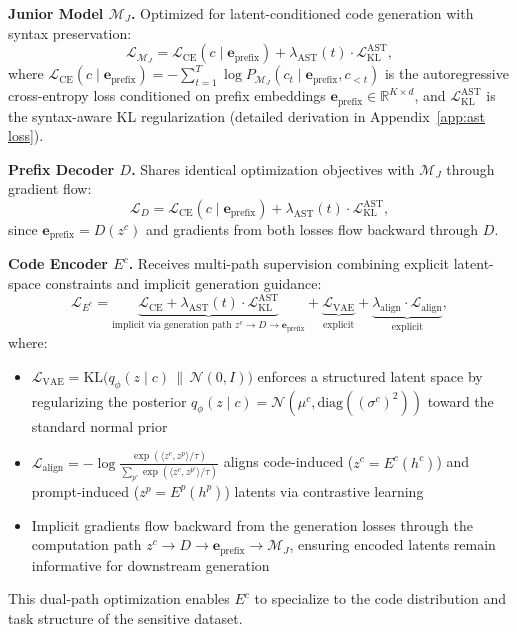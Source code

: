\documentclass{article}
\theoremstyle{plain}
\theoremstyle{definition}
\theoremstyle{remark}
\begin{document}
{\noindent\textbf{Junior Model $\mathcal{M}_J$.} Optimized for latent-conditioned code generation with syntax preservation:
\begin{equation}
\mathcal{L}_{\mathcal{M}_J} = \mathcal{L}_{\text{CE}}(c \mid \mathbf{e}_{\text{prefix}}) + \lambda_{\text{AST}}(t) \cdot \mathcal{L}_{\text{KL}}^{\text{AST}},
\end{equation}
where $\mathcal{L}_{\text{CE}}(c \mid \mathbf{e}_{\text{prefix}}) = -\sum_{t=1}^{T} \log P_{\mathcal{M}_J}(c_t \mid \mathbf{e}_{\text{prefix}}, c_{<t})$ is the autoregressive cross-entropy loss conditioned on prefix embeddings $\mathbf{e}_{\text{prefix}} \in \mathbb{R}^{K \times d}$, and $\mathcal{L}_{\text{KL}}^{\text{AST}}$ is the syntax-aware KL regularization (detailed derivation in Appendix~\ref{app:ast loss}).

\noindent\textbf{Prefix Decoder $D$.} Shares identical optimization objectives with $\mathcal{M}_J$ through gradient flow:
\begin{equation}
\mathcal{L}_{D} = \mathcal{L}_{\text{CE}}(c \mid \mathbf{e}_{\text{prefix}}) + \lambda_{\text{AST}}(t) \cdot \mathcal{L}_{\text{KL}}^{\text{AST}},
\end{equation}
since $\mathbf{e}_{\text{prefix}} = D(z^c)$ and gradients from both losses flow backward through $D$.

\noindent\textbf{Code Encoder $E^c$.} Receives multi-path supervision combining explicit latent-space constraints and implicit generation guidance:
\begin{equation}
\mathcal{L}_{E^c} = \underbrace{\mathcal{L}_{\text{CE}} + \lambda_{\text{AST}}(t) \cdot \mathcal{L}_{\text{KL}}^{\text{AST}}}_{\text{implicit via generation path } z^c \to D \to \mathbf{e}_{\text{prefix}}} + \underbrace{\mathcal{L}_{\text{VAE}}}_{\text{explicit}} + \underbrace{\lambda_{\text{align}} \cdot \mathcal{L}_{\text{align}}}_{\text{explicit}},
\end{equation}
where:
\begin{itemize}
    \item $\mathcal{L}_{\text{VAE}} = \mathrm{KL}\big(q_{\phi}(z \mid c) \,\|\, \mathcal{N}(0, I)\big)$ enforces a structured latent space by regularizing the posterior $q_{\phi}(z \mid c) = \mathcal{N}(\mu^c, \mathrm{diag}((\sigma^c)^2))$ toward the standard normal prior
    \item $\mathcal{L}_{\text{align}} = -\log \frac{\exp(\langle z^c, z^p \rangle / \tau)}{\sum_{p'} \exp(\langle z^c, z^{p'} \rangle / \tau)}$ aligns code-induced ($z^c = E^c(h^c)$) and prompt-induced ($z^p = E^p(h^p)$) latents via contrastive learning~\cite{oord2018representation}
    \item Implicit gradients flow backward from the generation losses through the computation path $z^c \to D \to \mathbf{e}_{\text{prefix}} \to \mathcal{M}_J$, ensuring encoded latents remain informative for downstream generation
\end{itemize}
This dual-path optimization enables $E^c$ to specialize to the code distribution and task structure of the sensitive dataset.

}
\end{document}
